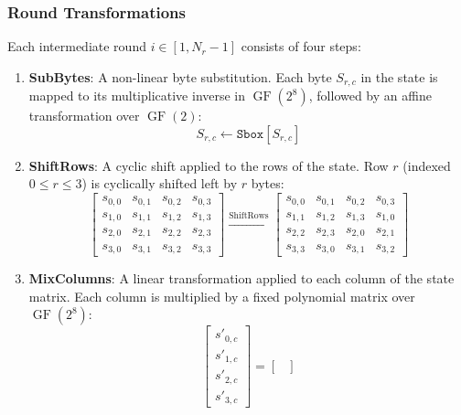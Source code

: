 \documentclass[11pt,a4paper]{article}
\DeclareMathOperator{\GF}{GF}
\begin{document}
\subsubsection{Round Transformations}
Each intermediate round $i \in [1, N_r-1]$ consists of four steps:
\begin{enumerate}
    \item \textbf{SubBytes}: A non-linear byte substitution. Each byte $S_{r,c}$ in the state is mapped to its multiplicative inverse in $\GF(2^8)$, followed by an affine transformation over $\GF(2)$:
    \begin{equation}
        S_{r,c} \leftarrow \mathtt{Sbox}[S_{r,c}]
    \end{equation}
    \item \textbf{ShiftRows}: A cyclic shift applied to the rows of the state. Row $r$ (indexed $0 \le r \le 3$) is cyclically shifted left by $r$ bytes:
    \begin{equation}
        \begin{bmatrix}
            s_{0,0} & s_{0,1} & s_{0,2} & s_{0,3} \\
            s_{1,0} & s_{1,1} & s_{1,2} & s_{1,3} \\
            s_{2,0} & s_{2,1} & s_{2,2} & s_{2,3} \\
            s_{3,0} & s_{3,1} & s_{3,2} & s_{3,3}
        \end{bmatrix}
        \xrightarrow{\text{ShiftRows}}
        \begin{bmatrix}
            s_{0,0} & s_{0,1} & s_{0,2} & s_{0,3} \\
            s_{1,1} & s_{1,2} & s_{1,3} & s_{1,0} \\
            s_{2,2} & s_{2,3} & s_{2,0} & s_{2,1} \\
            s_{3,3} & s_{3,0} & s_{3,1} & s_{3,2}
        \end{bmatrix}
    \end{equation}
    \item \textbf{MixColumns}: A linear transformation applied to each column of the state matrix. Each column is multiplied by a fixed polynomial matrix over $\GF(2^8)$:
    \begin{equation}
        \begin{bmatrix}
            s'_{0,c} \\ s'_{1,c} \\ s'_{2,c} \\ s'_{3,c}
        \end{bmatrix} = 
        \begin{bmatrix}

\end{bmatrix}
\end{equation}
\end{enumerate}
\end{document}

